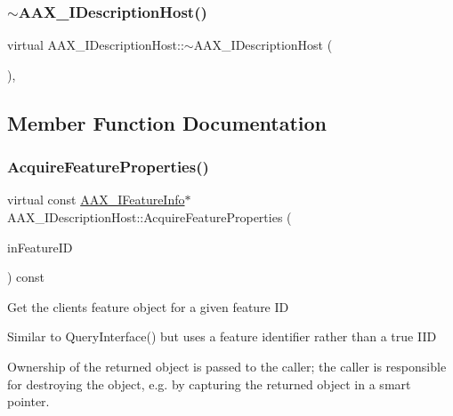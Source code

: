 \subsubsection{\texorpdfstring{$\sim$AAX\_IDescriptionHost()}{~AAX\_IDescriptionHost()}}
{\footnotesize\ttfamily virtual A\+A\+X\+\_\+\+I\+Description\+Host\+::$\sim$\+A\+A\+X\+\_\+\+I\+Description\+Host (\begin{DoxyParamCaption}{ }\end{DoxyParamCaption})\hspace{0.3cm}{\ttfamily [inline]}, {\ttfamily [virtual]}}



\subsection{Member Function Documentation}
\mbox{\label{a01793_aa0d9e27d0207113f98c217d870bfa5e9}} 
\subsubsection{\texorpdfstring{AcquireFeatureProperties()}{AcquireFeatureProperties()}}
{\footnotesize\ttfamily virtual const \mbox{\hyperlink{a01829}{A\+A\+X\+\_\+\+I\+Feature\+Info}}$\ast$ A\+A\+X\+\_\+\+I\+Description\+Host\+::\+Acquire\+Feature\+Properties (\begin{DoxyParamCaption}\item[{const \mbox{\hyperlink{a00392_a53d6cf8a08224b3e813333e411ce798e}{A\+A\+X\+\_\+\+Feature\+\_\+\+U\+ID}} \&}]{in\+Feature\+ID }\end{DoxyParamCaption}) const\hspace{0.3cm}{\ttfamily [pure virtual]}}

Get the client\textquotesingle{}s feature object for a given feature ID

Similar to {\ttfamily Query\+Interface()} but uses a feature identifier rather than a true I\+ID

Ownership of the returned object is passed to the caller; the caller is responsible for destroying the object, e.\+g. by capturing the returned object in a smart pointer.


\begin{DoxyCode}{0}
\DoxyCodeLine{\textcolor{comment}{// AAX\_IDescriptionHost* descHost}}
\end{DoxyCode}



